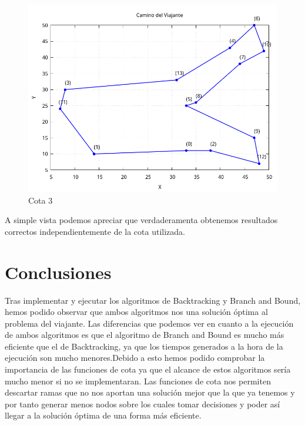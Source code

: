 \documentclass[11pt,openany]{book}
\begin{document}
\begin{figure}[H]
\begin{minipage}{.48\textwidth}
            \centering
            \includegraphics[width=1\linewidth]{assets/Img/Cota_3_BB/grafico_14_1_cota3.png}
            \caption{Cota 3}
            \label{fig:Nodos}
      \end{minipage}
\end{figure}


A simple vista podemos apreciar que verdaderamenta obtenemos resultados correctos independientemente de la 
cota utilizada.

\chapter{Conclusiones}
Tras implementar y ejecutar los algoritmos de Backtracking y Branch and Bound, hemos podido observar que ambos algoritmos nos una solución óptima al problema del viajante.
Las diferencias que podemos ver en cuanto a la ejecución de ambos algoritmos es que el algoritmo de Branch and Bound es mucho más eficiente que el de Backtracking, ya que
los tiempos generados a la hora de la ejecución son mucho menores.Debido a esto hemos podido comprobar la importancia de las funciones de cota ya que 
el alcance de estos algoritmos sería mucho menor si no se implementaran. Las funciones de cota nos permiten descartar ramas que no nos aportan una solución mejor que la que ya tenemos y por 
tanto generar menos nodos sobre los cuales tomar decisiones y poder así llegar a la solución óptima de una forma más eficiente.
\end{document}
